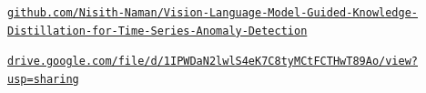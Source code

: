 \documentclass[a1,portrait]{a0poster}
\newlength{\colwidth}
\newlength{\colheight}
\begin{document}
\begin{minipage}[t][\dimexpr\paperheight-0.4cm\relax][t]{\paperwidth}
\begin{minipage}[t][\colheight][s]{\colwidth}
{\scriptsize\raggedright
\href{https://github.com/Nisith-Naman/Vision-Language-Model-Guided-Knowledge-Distillation-for-Time-Series-Anomaly-Detection}{\nolinkurl{github.com/Nisith-Naman/Vision-Language-Model-Guided-Knowledge-Distillation-for-Time-Series-Anomaly-Detection}}\par
\href{https://drive.google.com/file/d/1IPWDaN2lwlS4eK7C8tyMCtFCTHwT89Ao/view?usp=sharing}{\nolinkurl{drive.google.com/file/d/1IPWDaN2lwlS4eK7C8tyMCtFCTHwT89Ao/view?usp=sharing}}\par}
\end{minipage}\hspace*{1.5cm}
\end{minipage}
\end{document}
